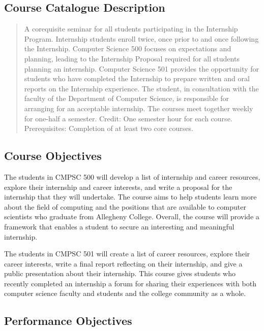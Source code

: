 \subsection*{Course Catalogue Description}

\begin{quote}
A corequisite seminar for all students participating in the Internship Program.  Internship students enroll twice, once
prior to and once following the Internship. Computer Science 500 focuses on expectations and planning, leading to the
Internship Proposal required for all students planning an internship.  Computer Science 501 provides the opportunity for
students who have completed the Internship to prepare written and oral reports on the Internship experience. The
student, in consultation with the faculty of the Department of Computer Science, is responsible for arranging for an
acceptable internship.  The courses meet together weekly for one-half a semester. Credit: One semester hour for each
course. Prerequisites: Completion of at least two core courses.
\end{quote}

\subsection*{Course Objectives}

The students in CMPSC 500 will develop a list of internship and career resources, explore their internship and career
interests, and write a proposal for the internship that they will undertake. The course aims to help students
learn more about the field of computing and the positions that are available to computer scientists who graduate from
Allegheny College.  Overall, the course will provide a framework that enables a student to secure an interesting and
meaningful internship.

\noindent
The students in CMPSC 501 will create a list of career resources, explore their career interests, write a final report
reflecting on their internship, and give a public presentation about their internship.  This course gives
students who recently completed an internship a forum for sharing their experiences with both computer science faculty
and students and the college community as a whole.

\subsection*{Performance Objectives}

